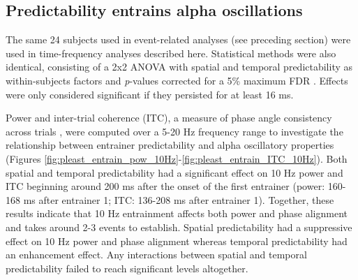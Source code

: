 \documentclass[dwyatte_dissertation.tex]{subfiles}
\begin{document}
\subsection{Predictability entrains alpha oscillations}
The same 24 subjects used in event-related analyses (see preceding section) were used in time-frequency analyses described here. Statistical methods were also identical, consisting of a 2x2 ANOVA with spatial and temporal predictability as within-subjects factors and \textit{p}-values corrected for a 5\% maximum FDR \cite{BenjaminiYekutieli01}. Effects were only considered significant if they persisted for at least 16 ms.

Power and inter-trial coherence (ITC), a measure of phase angle consistency across trials \cite{LachauxRodriguezMartinerieEtAl99}, were computed over a 5-20 Hz frequency range to investigate the relationship between entrainer predictability and alpha oscillatory properties (Figures \ref{fig:pleast_entrain_pow_10Hz}-\ref{fig:pleast_entrain_ITC_10Hz}). Both spatial and temporal predictability had a significant effect on 10 Hz power and ITC beginning around 200 ms after the onset of the first entrainer (power: 160-168 ms after entrainer 1; ITC: 136-208 ms after entrainer 1). Together, these results indicate that 10 Hz entrainment affects both power and phase alignment and takes around 2-3 events to establish. Spatial predictability had a suppressive effect on 10 Hz power and phase alignment whereas temporal predictability had an enhancement effect. Any interactions between spatial and temporal predictability failed to reach significant levels altogether.
\end{document}

